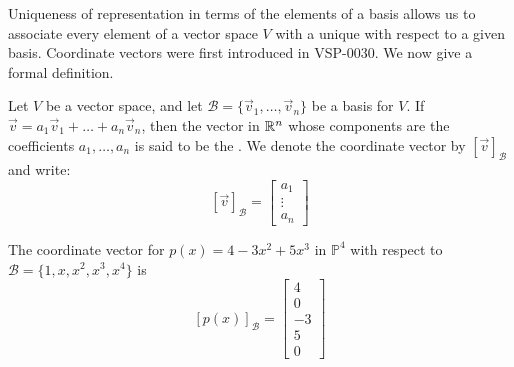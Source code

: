 \documentclass{ximera}
\begin{document}
Uniqueness of representation in terms of the elements of a basis allows us to associate every element of a vector space $V$ with a unique  with respect to a given basis.  Coordinate vectors were first introduced in VSP-0030.  We now give a formal definition.

\begin{definition}\label{def:coordvector}
Let $V$ be a vector space, and let $\mathcal{B}=\{\vec{v}_1, \ldots ,\vec{v}_n\}$ be a basis for $V$.  If $\vec{v}=a_1\vec{v}_1+\ldots +a_n\vec{v}_n$, then the vector in $\mathbb{R}^n$ whose components are the coefficients $a_1, \ldots ,a_n$  is said to be the .  We denote the coordinate vector by $[\vec{v}]_{\mathcal{B}}$ and write:
$$[\vec{v}]_{\mathcal{B}}=\begin{bmatrix}a_1\\\vdots \\a_n\end{bmatrix}$$
\end{definition}

\begin{example}\label{ex:coordvectorinpolyvectspace}
The coordinate vector for $p(x)=4-3x^2+5x^3$ in $\mathbb{P}^4$ with respect to $\mathcal{B}=\{1, x, x^2, x^3, x^4\}$ is 
$$[p(x)]_{\mathcal{B}}=\begin{bmatrix}4\\0\\-3\\5\\0\end{bmatrix}$$
\end{example}
\end{document}
